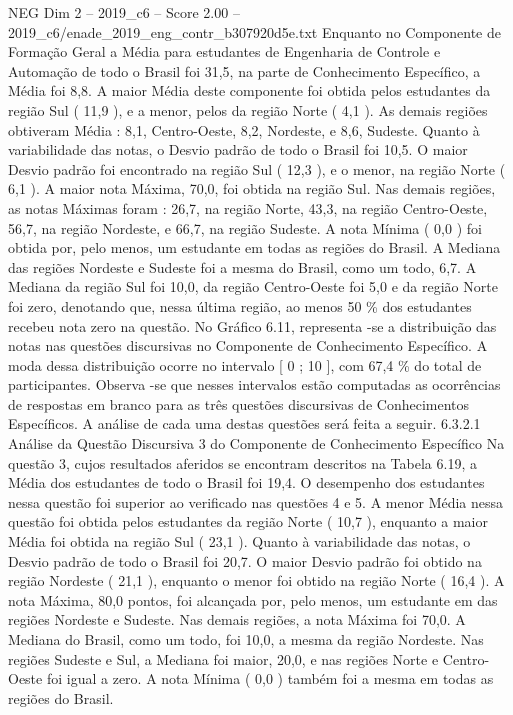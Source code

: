 \begin{textsample}{NEG Dim 2 – 2019\_c6 – Score 2.00 – 2019\_c6/enade\_2019\_eng\_contr\_b307920d5e.txt}
Enquanto no Componente de Formação Geral a Média para estudantes de Engenharia de Controle e Automação de todo o Brasil foi 31,5, na parte de Conhecimento Específico, a Média foi 8,8.
A maior Média deste componente foi obtida pelos estudantes da região Sul ( 11,9 ), e a menor, pelos da região Norte ( 4,1 ).
As demais regiões obtiveram Média : 8,1, Centro-Oeste, 8,2, Nordeste, e 8,6, Sudeste.
Quanto à variabilidade das notas, o Desvio padrão de todo o Brasil foi 10,5.
O maior Desvio padrão foi encontrado na região Sul ( 12,3 ), e o menor, na região Norte ( 6,1 ).
A maior nota Máxima, 70,0, foi obtida na região Sul.
Nas demais regiões, as notas Máximas foram : 26,7, na região Norte, 43,3, na região Centro-Oeste, 56,7, na região Nordeste, e 66,7, na região Sudeste.
A nota Mínima ( 0,0 ) foi obtida por, pelo menos, um estudante em todas as regiões do Brasil.
A Mediana das regiões Nordeste e Sudeste foi a mesma do Brasil, como um todo, 6,7.
A Mediana da região Sul foi 10,0, da região Centro-Oeste foi 5,0 e da região Norte foi zero, denotando que, nessa última região, ao menos 50 \% dos estudantes recebeu nota zero na questão.
No Gráfico 6.11, representa -se a distribuição das notas nas questões discursivas no Componente de Conhecimento Específico.
A moda dessa distribuição ocorre no intervalo [ 0 ; 10 ], com 67,4 \% do total de participantes.
Observa -se que nesses intervalos estão computadas as ocorrências de respostas em branco para as três questões discursivas de Conhecimentos Específicos.
A análise de cada uma destas questões será feita a seguir. 6.3.2.1 Análise da Questão Discursiva 3 do Componente de Conhecimento Específico Na questão 3, cujos resultados aferidos se encontram descritos na Tabela 6.19, a Média dos estudantes de todo o Brasil foi 19,4.
O desempenho dos estudantes nessa questão foi superior ao verificado nas questões 4 e 5.
A menor Média nessa questão foi obtida pelos estudantes da região Norte ( 10,7 ), enquanto a maior Média foi obtida na região Sul ( 23,1 ).
Quanto à variabilidade das notas, o Desvio padrão de todo o Brasil foi 20,7.
O maior Desvio padrão foi obtido na região Nordeste ( 21,1 ), enquanto o menor foi obtido na região Norte ( 16,4 ).
A nota Máxima, 80,0 pontos, foi alcançada por, pelo menos, um estudante em das regiões Nordeste e Sudeste.
Nas demais regiões, a nota Máxima foi 70,0.
A Mediana do Brasil, como um todo, foi 10,0, a mesma da região Nordeste.
Nas regiões Sudeste e Sul, a Mediana foi maior, 20,0, e nas regiões Norte e Centro-Oeste foi igual a zero.
A nota Mínima ( 0,0 ) também foi a mesma em todas as regiões do Brasil.

\end{textsample}
